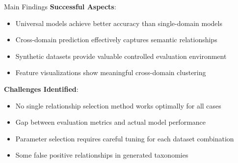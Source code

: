\documentclass[aspectratio=169]{beamer}
\begin{document}
\begin{frame}{Main Findings}
    \textbf{Successful Aspects}:
    \begin{itemize}
        \item Universal models achieve better accuracy than single-domain models
        \item Cross-domain prediction effectively captures semantic relationships
        \item Synthetic datasets provide valuable controlled evaluation environment
        \item Feature visualizations show meaningful cross-domain clustering
    \end{itemize}

    \vspace{1em}

    \textbf{Challenges Identified}:
    \begin{itemize}
        \item No single relationship selection method works optimally for all cases
        \item Gap between evaluation metrics and actual model performance
        \item Parameter selection requires careful tuning for each dataset combination
        \item Some false positive relationships in generated taxonomies
    \end{itemize}
\end{frame}
\end{document}
